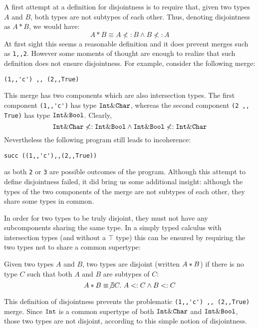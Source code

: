 A first attempt at a definition for disjointness is to require that, given two types $A$ and $B$, both types are not
subtypes of each other. Thus, denoting disjointness as $A * B$, we would have:
\[A * B \equiv A \not<: B \wedge B \not<: A\]
At first sight this seems a reasonable definition and it does prevent
merges such as \lstinline{1,,2}. However some moments of thought are enough to realize that
such definition does not ensure disjointness. For example, consider
the following merge:

\begin{lstlisting}
(1,,'c') ,, (2,,True)
\end{lstlisting}

\noindent This merge has two components which are also intersection
types. The first component \lstinline{(1,,'c')} has type $\texttt{Int} \&
\texttt{Char}$, whereas the second component \lstinline{(2 ,, True)} has type
$\texttt{Int} \& \texttt{Bool}$. Clearly,
\[ \texttt{Int} \& \texttt{Char} \not <: \texttt{Int} \& \texttt{Bool} \wedge \texttt{Int} \& \texttt{Bool} \not <: \texttt{Int} \& \texttt{Char} \]
Nevertheless the following program still leads to
incoherence:
\begin{lstlisting}
succ ((1,,'c'),,(2,,True))
\end{lstlisting}
as both \lstinline{2} or \lstinline{3} are possible outcomes
of the program. Although this attempt to define disjointness failed,
it did bring us some additional insight: although the types of the two
components of the merge are not subtypes of each other, they share
some types in common.

In order for two types to be truly disjoint, they must not have any
subcomponents sharing the same type. In a simply typed calculus with intersection
types (and without a $\top$ type) this can be ensured by requiring the two types 
not to share a common supertype: 

\begin{definition}
  Given two types $A$ and $B$, two types are disjoint
  (written $A * B$) if there is no type $C$ such that both $A$ and $B$ are
  subtypes of $C$:
  \[A * B \equiv \not\exists C.~A <: C \wedge B <: C\]
\end{definition}

\noindent This definition of disjointness prevents the problematic
\lstinline$(1,,'c') ,, (2,,True)$ merge. Since $\texttt{Int}$ is a
common supertype of both $\texttt{Int} \& \texttt{Char}$ and $\texttt{Int}
\& \texttt{Bool}$, those two types are not disjoint, according to this
simple notion of disjointness.

